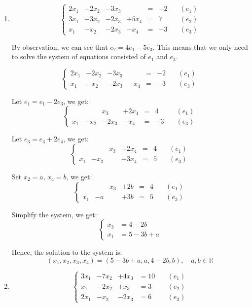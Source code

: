 \documentclass{article}
\begin{document}
\begin{enumerate}[label=(\alph*)]
\item 
\[\left\{
\begin{aligned}
2x_1&-2x_2&-3x_3& &= &-2 &\quad (e_1)\\
3x_1&-3x_2&-2x_3&+5x_4 &= &7 &\quad (e_2)\\
x_1&-x_2&-2x_3&-x_4 &= &-3 &\quad (e_3)
\end{aligned}
\right.
\]

By observation, we can see that $e_2 = 4e_1 - 5e_3$. This means that we only need to solve the system of equations consisted of $e_1$ and $e_3$.

\[\left\{
\begin{aligned}
2x_1&-2x_2&-3x_3& &= &-2 &\quad (e_1)\\
x_1&-x_2&-2x_3&-x_4 &= &-3 &\quad (e_3)
\end{aligned}
\right.
\]

Let $e_1 = e_1 - 2e_3$, we get:
\[\left\{
\begin{aligned}
&&x_3&+2x_4&= & 4&\quad (e_1)\\
x_1&-x_2&-2x_3&-x_4 &= &-3 &\quad (e_3)
\end{aligned}
\right.
\]

Let $e_3 = e_3 + 2e_4$, we get:
\[\left\{
\begin{aligned}
&&x_3&+2x_4&= & 4&\quad (e_1)\\
x_1&-x_2& &+3x_4&= & 5&\quad (e_3)
\end{aligned}
\right.
\]

Set $x_2 = a$, $x_4 = b$, we get:
\[\left\{
\begin{aligned}
&&x_3&+2b&= & 4&\quad (e_1)\\
x_1&-a& &+3b &= &5 &\quad (e_3)
\end{aligned}
\right.
\]

Simplify the system, we get:
\[\left\{
\begin{aligned}
x_3 &= 4 - 2b\\
x_1 &= 5 - 3b + a
\end{aligned}
\right.
\]

Hence, the solution to the system is:
\[
(x_1, x_2, x_3, x_4) = (5 - 3b + a, a, 4 - 2b, b), \quad a, b \in \mathbb{R}
\]

\item 
\[
\left\{
\begin{aligned}
3x_1&-7x_2&+4x_3 &= 10 &\quad (e_1)\\
x_1&-2x_2&+x_3 &= 3 &\quad (e_2)\\
2x_1&-x_2&-2x_3 &= 6 &\quad (e_3)
\end{aligned}
\right.
\]
\end{enumerate}
\end{document}
